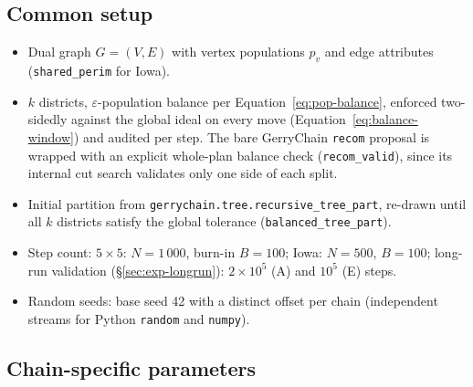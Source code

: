 \documentclass[11pt]{article}
\begin{document}
\subsection{Common setup}\label{app:common}

\begin{itemize}
  \item Dual graph $G = (V, E)$ with vertex populations $p_v$ and
    edge attributes (\texttt{shared\_perim} for Iowa).
  \item $k$ districts, $\varepsilon$-population balance per
    Equation~\eqref{eq:pop-balance}, enforced two-sidedly against the
    global ideal on every move (Equation~\eqref{eq:balance-window})
    and audited per step. The bare GerryChain \texttt{recom} proposal
    is wrapped with an explicit whole-plan balance check
    (\texttt{recom\_valid}), since its internal cut search validates
    only one side of each split.
  \item Initial partition from
    \texttt{gerrychain.tree.recursive\_tree\_part}, re-drawn until all
    $k$ districts satisfy the global tolerance
    (\texttt{balanced\_tree\_part}).
  \item Step count: $5 \times 5$: $N = 1\,000$, burn-in $B = 100$;
    Iowa: $N = 500$, $B = 100$; long-run validation
    (\S\ref{sec:exp-longrun}): $2 \times 10^5$ (A) and
    $10^5$ (E) steps.
  \item Random seeds: base seed 42 with a distinct offset per chain
    (independent streams for Python \texttt{random} and
    \texttt{numpy}).
\end{itemize}

\subsection{Chain-specific parameters}\label{app:chains}
\end{document}
